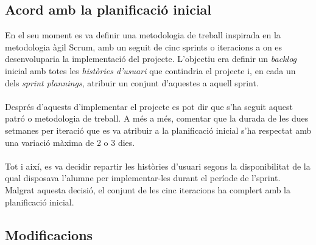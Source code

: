 \subsection{Acord amb la planificació inicial}

En el seu moment es va definir una metodologia de treball inspirada en la metodologia àgil Scrum, amb un seguit de cinc sprints o iteracions a on es desenvoluparia la implementació del projecte. L'objectiu era definir un \textit{backlog} inicial amb totes les \textit{històries d'usuari} que contindria el projecte i, en cada un dels \textit{sprint plannings}, atribuir un conjunt d'aquestes a aquell sprint.
\\\\
Després d'aquests d'implementar el projecte es pot dir que s'ha seguit aquest patró o metodologia de treball. A més a més, comentar que la durada de les dues setmanes per iteració que es va atribuir a la planificació inicial s'ha respectat amb una variació màxima de 2 o 3 dies.
\\\\
Tot i així, es va decidir repartir les històries d'usuari segons la disponibilitat de la qual disposava l'alumne per implementar-les durant el període de l'sprint. Malgrat aquesta decisió, el conjunt de les cinc iteracions ha complert amb la planificació inicial.

\subsection{Modificacions}

